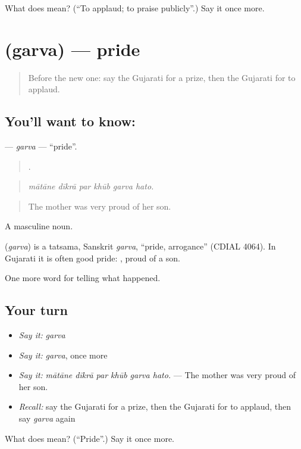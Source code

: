 \begin{tcolorbox}[breakable,colback=teal!4,colframe=teal!35!black,title={Before you move on}]
What does  mean? (\textquotedblleft{}To applaud; to praise publicly\textquotedblright{}.) Say it once more.
\end{tcolorbox}
\section[\texorpdfstring{\gu{ગર્વ} (garva)}{ગર્વ (garva)}]{ (garva) — pride}

\label{lesson:GU-C309-garva}



\begin{quote}
Before the new one: say the Gujarati for a prize, then the Gujarati for to applaud.
\end{quote}

\subsection*{You'll want to know: }
\textbf{} — \emph{garva} — \textquotedblleft{}pride\textquotedblright{}.

\begin{quote}
     .
\end{quote}

\begin{quote}
\emph{mātāne dīkrā par khūb garva hato.}
\end{quote}

\begin{quote}
The mother was very proud of her son.
\end{quote}

A masculine noun.

\begin{cousinweb}
\textbf{} (\emph{garva}) is a tatsama, Sanskrit \emph{garva}, \textquotedblleft{}pride, arrogance\textquotedblright{} (CDIAL 4064). In Gujarati it is often good pride: \textbf{  }, proud of a son.
\end{cousinweb}

\begin{grammarlens}[title={What you've built}]
One more word for telling what happened.
\end{grammarlens}

\subsection*{Your turn}
\begin{itemize}
\raggedright
  \item \emph{Say it:} \emph{garva}
  \item \emph{Say it:} \emph{garva}, once more
  \item \emph{Say it:} \emph{mātāne dīkrā par khūb garva hato.} — The mother was very proud of her son.
  \item \emph{Recall:} say the Gujarati for a prize, then the Gujarati for to applaud, then say \emph{garva} again
\end{itemize}

\begin{tcolorbox}[breakable,colback=teal!4,colframe=teal!35!black,title={Before you move on}]
What does  mean? (\textquotedblleft{}Pride\textquotedblright{}.) Say it once more.
\end{tcolorbox}
